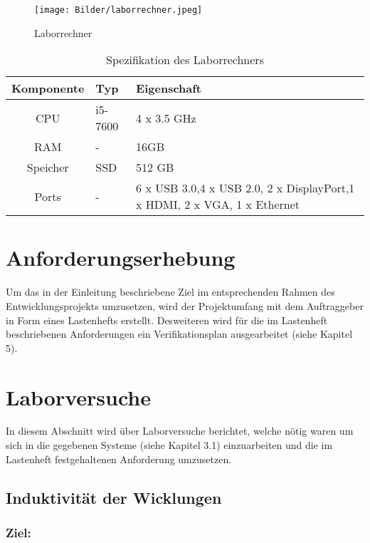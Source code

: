 \begin{figure}[H]
\centering
\texttt{[image: Bilder/laborrechner.jpeg]} 
\caption{Laborrechner}
\label{fig: laborrechner}
\end{figure}

\begin{table}[h]
	\centering
	\begin{tabular}{c|p{4cm}|p{4cm}}
		\hline
		Komponente & Typ & Eigenschaft\\ \hline
		CPU & i5-7600 & 4 x 3.5 GHz\\ \hline
		RAM& - & 16GB\\ \hline
		Speicher &     SSD  &    512 GB    \\\hline
		Ports  &     -   &       6 x USB 3.0,4 x USB 2.0, 2 x DisplayPort,1 x HDMI, 2 x VGA, 1 x Ethernet     \\
		\hline
	\end{tabular}
	\caption{Spezifikation des Laborrechners}
	\label{x}
\end{table}


\section{Anforderungserhebung}

Um das in der Einleitung beschriebene Ziel im entsprechenden Rahmen des Entwicklungsprojekts umzusetzen, wird der Projektumfang mit dem Auftraggeber in Form eines Lastenhefts erstellt. Desweiteren wird für die im Lastenheft beschriebenen Anforderungen ein Verifikationsplan ausgearbeitet (siehe Kapitel 5).\newline



\section{Laborversuche}

In diesem Abschnitt wird über Laborversuche berichtet, welche nötig waren um sich in die gegebenen Systeme (siehe Kapitel 3.1) einzuarbeiten und die im Lastenheft festgehaltenen Anforderung umzusetzen.

\subsection{Induktivität der Wicklungen}
\subsubsection{Ziel:}

